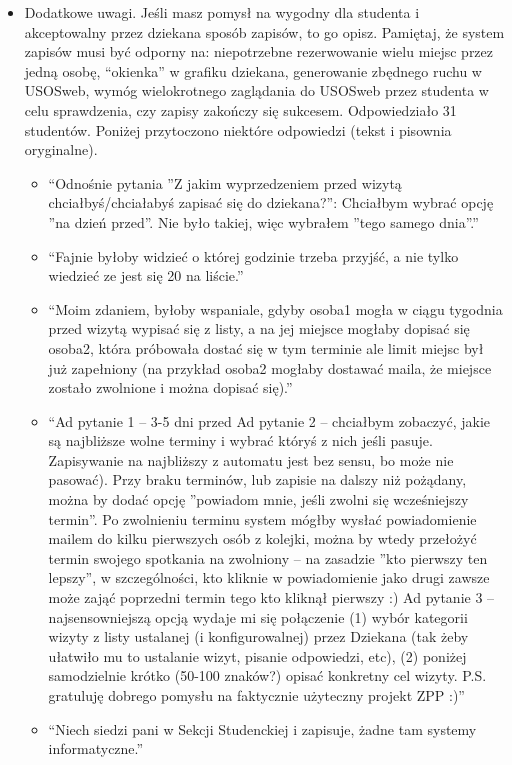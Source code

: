 \documentclass[licencjacka]{pracamgr}
\begin{document}
\begin{itemize}
\item Dodatkowe uwagi. Jeśli masz pomysł na wygodny dla studenta i akceptowalny przez dziekana sposób zapisów, to go opisz. Pamiętaj, że system zapisów musi być odporny na: niepotrzebne rezerwowanie wielu miejsc przez jedną osobę, \enquote{okienka} w grafiku dziekana, generowanie zbędnego ruchu w USOSweb, wymóg wielokrotnego zaglądania do USOSweb przez studenta w celu sprawdzenia, czy zapisy zakończy się sukcesem.
Odpowiedziało 31 studentów. Poniżej przytoczono niektóre odpowiedzi (tekst i pisownia oryginalne).
\begin{itemize}
\setlength\itemsep{0,1em}
\item \enquote{Odnośnie pytania ''Z jakim wyprzedzeniem przed wizytą chciałbyś/chciałabyś zapisać się do dziekana?'':    Chciałbym wybrać opcję ''na dzień przed''. Nie było takiej, więc wybrałem ''tego samego dnia''.}
\item \enquote{Fajnie byłoby widzieć o której godzinie trzeba przyjść, a nie tylko wiedzieć ze jest się 20 na liście.}
\item \enquote{Moim zdaniem, byłoby wspaniale, gdyby osoba1 mogła w ciągu tygodnia przed wizytą wypisać się z listy, a na jej miejsce mogłaby dopisać się osoba2, która próbowała dostać się w tym terminie ale limit miejsc był już zapełniony (na przykład osoba2 mogłaby dostawać maila, że miejsce zostało zwolnione i można dopisać się).}
\item \enquote{Ad pytanie 1 -- 3-5 dni przed    Ad pytanie 2 -- chciałbym zobaczyć, jakie są najbliższe wolne terminy i wybrać któryś z nich jeśli pasuje. Zapisywanie na najbliższy z automatu jest bez sensu, bo może nie pasować). Przy braku terminów, lub zapisie na dalszy niż pożądany, można by dodać opcję ''powiadom mnie, jeśli zwolni się wcześniejszy termin''. Po zwolnieniu terminu system mógłby wysłać powiadomienie mailem do kilku pierwszych osób z kolejki, można by wtedy przełożyć termin swojego spotkania na zwolniony -- na zasadzie ''kto pierwszy ten lepszy'', w szczególności, kto kliknie w powiadomienie jako drugi zawsze może zająć poprzedni termin tego kto kliknął pierwszy :)    Ad pytanie 3 -- najsensowniejszą opcją wydaje mi się połączenie    (1) wybór kategorii wizyty z listy ustalanej (i konfigurowalnej) przez Dziekana (tak żeby ułatwiło mu to ustalanie wizyt, pisanie odpowiedzi, etc),    (2) poniżej samodzielnie krótko (50-100 znaków?) opisać konkretny cel wizyty.    P.S. gratuluję dobrego pomysłu na faktycznie użyteczny projekt ZPP :)}
\item \enquote{Niech siedzi pani w Sekcji Studenckiej i zapisuje, żadne tam systemy informatyczne.}

\end{itemize}
\end{itemize}
\end{document}
